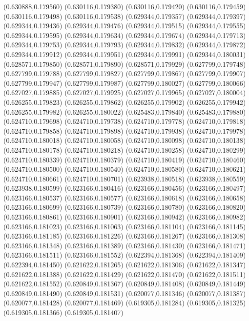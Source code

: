 (0.630888,0.179560)
(0.630116,0.179380)
(0.630116,0.179420)
(0.630116,0.179459)
(0.630116,0.179498)
(0.630116,0.179538)
(0.629344,0.179357)
(0.629344,0.179397)
(0.629344,0.179436)
(0.629344,0.179476)
(0.629344,0.179515)
(0.629344,0.179555)
(0.629344,0.179595)
(0.629344,0.179634)
(0.629344,0.179674)
(0.629344,0.179713)
(0.629344,0.179753)
(0.629344,0.179793)
(0.629344,0.179832)
(0.629344,0.179872)
(0.629344,0.179912)
(0.629344,0.179951)
(0.629344,0.179991)
(0.629344,0.180031)
(0.628571,0.179850)
(0.628571,0.179890)
(0.628571,0.179929)
(0.627799,0.179748)
(0.627799,0.179788)
(0.627799,0.179827)
(0.627799,0.179867)
(0.627799,0.179907)
(0.627799,0.179947)
(0.627799,0.179987)
(0.627799,0.180027)
(0.627799,0.180066)
(0.627027,0.179885)
(0.627027,0.179925)
(0.627027,0.179965)
(0.627027,0.180004)
(0.626255,0.179823)
(0.626255,0.179862)
(0.626255,0.179902)
(0.626255,0.179942)
(0.626255,0.179982)
(0.626255,0.180022)
(0.625483,0.179840)
(0.625483,0.179880)
(0.624710,0.179698)
(0.624710,0.179738)
(0.624710,0.179778)
(0.624710,0.179818)
(0.624710,0.179858)
(0.624710,0.179898)
(0.624710,0.179938)
(0.624710,0.179978)
(0.624710,0.180018)
(0.624710,0.180058)
(0.624710,0.180098)
(0.624710,0.180138)
(0.624710,0.180178)
(0.624710,0.180218)
(0.624710,0.180258)
(0.624710,0.180299)
(0.624710,0.180339)
(0.624710,0.180379)
(0.624710,0.180419)
(0.624710,0.180460)
(0.624710,0.180500)
(0.624710,0.180540)
(0.624710,0.180580)
(0.624710,0.180621)
(0.624710,0.180661)
(0.624710,0.180701)
(0.623938,0.180518)
(0.623938,0.180559)
(0.623938,0.180599)
(0.623166,0.180416)
(0.623166,0.180456)
(0.623166,0.180497)
(0.623166,0.180537)
(0.623166,0.180577)
(0.623166,0.180618)
(0.623166,0.180658)
(0.623166,0.180699)
(0.623166,0.180739)
(0.623166,0.180780)
(0.623166,0.180820)
(0.623166,0.180861)
(0.623166,0.180901)
(0.623166,0.180942)
(0.623166,0.180982)
(0.623166,0.181023)
(0.623166,0.181063)
(0.623166,0.181104)
(0.623166,0.181145)
(0.623166,0.181185)
(0.623166,0.181226)
(0.623166,0.181267)
(0.623166,0.181308)
(0.623166,0.181348)
(0.623166,0.181389)
(0.623166,0.181430)
(0.623166,0.181471)
(0.623166,0.181511)
(0.623166,0.181552)
(0.622394,0.181368)
(0.622394,0.181409)
(0.622394,0.181450)
(0.621622,0.181265)
(0.621622,0.181306)
(0.621622,0.181347)
(0.621622,0.181388)
(0.621622,0.181429)
(0.621622,0.181470)
(0.621622,0.181511)
(0.621622,0.181552)
(0.620849,0.181367)
(0.620849,0.181408)
(0.620849,0.181449)
(0.620849,0.181490)
(0.620849,0.181531)
(0.620077,0.181346)
(0.620077,0.181387)
(0.620077,0.181428)
(0.620077,0.181469)
(0.619305,0.181284)
(0.619305,0.181325)
(0.619305,0.181366)
(0.619305,0.181407)
